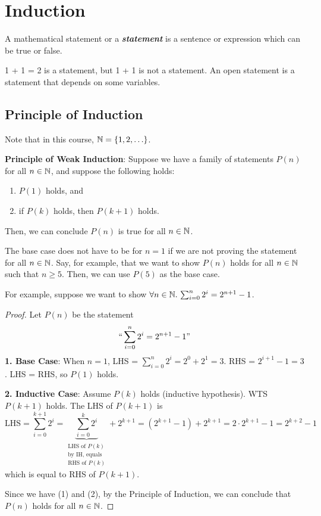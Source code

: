 \section{Induction}

\begin{definition}
    A mathematical statement or a \textit{\textbf{statement}} is a sentence or expression which can be true or false.
\end{definition}

1 + 1 = 2 is a statement, but 1 + 1 is not a statement. An open statement is a statement that depends on some variables.

\subsection{Principle of Induction}

Note that in this course, $\mathbb{N} = \{1,2,\ldots\}$.

\textbf{Principle of Weak Induction}: Suppose we have a family of statements $P(n)$ for all $n \in \mathbb{N}$, and suppose the following holds:
\begin{enumerate}
    \item $P(1)$ holds, and
    \item if $P(k)$ holds, then $P(k+1)$ holds.
\end{enumerate}
Then, we can conclude $P(n)$ is true for all $n \in \mathbb{N}$.

\begin{remark}
    The base case does not have to be for $n=1$ if we are not proving the statement for all $n \in \mathbb{N}$. Say, for example, that we want to show $P(n)$ holds for all $n \in \mathbb{N}$ such that $n \geq 5$. Then, we can use $P(5)$ as the base case.
\end{remark}

For example, suppose we want to show $\forall n \in \mathbb{N}.\, \sum_{i=0}^n 2^i = 2^{n+1} - 1$.

\begin{proof}
    Let $P(n)$ be the statement
    $$
    ``\sum_{i=0}^{n}2^i = 2^{n+1} - 1"
    $$
    \textbf{1. Base Case}: When $n=1$, LHS = $\sum_{i=0}^n 2^i = 2^0 + 2^1 = 3$. RHS = $2^{i+1} - 1 = 3$. LHS = RHS, so $P(1)$ holds.
    
    \textbf{2. Inductive Case}: Assume $P(k)$ holds (inductive hypothesis). WTS $P(k+1)$ holds. The LHS of $P(k+1)$ is
    $$
    \text{LHS} = \sum_{i=0}^{k+1} 2^i = \underbrace{\sum_{i=0}^k 2^i}_{\substack{\text{LHS of $P(k)$} \\ \text{by IH, equals} \\ \text{RHS of $P(k)$}}} + 2^{k+1} = (2^{k+1} - 1) + 2^{k+1} = 2\cdot 2^{k+1} - 1 = 2^{k+2} - 1
    $$
    which is equal to RHS of $P(k+1)$.

    Since we have (1) and (2), by the Principle of Induction, we can conclude that $P(n)$ holds for all $n \in \mathbb{N}$.
\end{proof}

